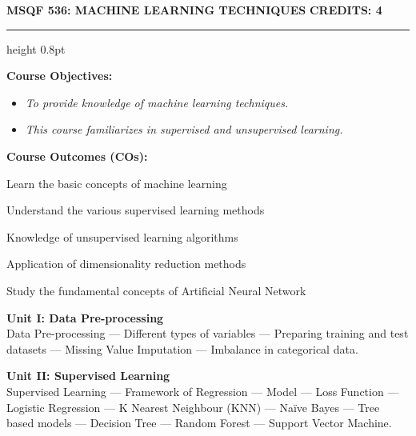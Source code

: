 
\newpage
\thispagestyle{plain}

\begin{center}
    {\large\textbf{MSQF 536: MACHINE LEARNING TECHNIQUES}} \hfill {\large\textbf{CREDITS: 4}}
\end{center}
\vspace{-0.6em}
\hrule height 0.8pt
\vspace{0.6em}

\noindent\textbf{Course Objectives:}
\begin{itemize}[leftmargin=1.5em, label=$\bullet$, noitemsep, topsep=1pt, parsep=1pt]
    \item \textit{To provide knowledge of machine learning techniques.}
    \item \textit{This course familiarizes in supervised and unsupervised learning.}
\end{itemize}

\vspace{0.4em}
\noindent\textbf{Course Outcomes (COs):}
\begin{description}[leftmargin=1.4cm, labelsep=0.4em, itemsep=1pt, topsep=1pt, parsep=0pt, font=\normalfont\textbf]
    \item[CO1:] Learn the basic concepts of machine learning
    \item[CO2:] Understand the various supervised learning methods
    \item[CO3:] Knowledge of unsupervised learning algorithms
    \item[CO4:] Application of dimensionality reduction methods
    \item[CO5:] Study the fundamental concepts of Artificial Neural Network
\end{description}

\vspace{0.4em}
\noindent\textbf{Unit I: Data Pre-processing}\\
\small
Data Pre-processing --- Different types of variables --- Preparing training and test datasets --- Missing Value Imputation --- Imbalance in categorical data.
\normalsize

\vspace{0.3em}
\noindent\textbf{Unit II: Supervised Learning}\\
\small
Supervised Learning --- Framework of Regression --- Model --- Loss Function --- Logistic Regression --- K Nearest Neighbour (KNN) --- Naïve Bayes --- Tree based models --- Decision Tree --- Random Forest --- Support Vector Machine.
\normalsize


